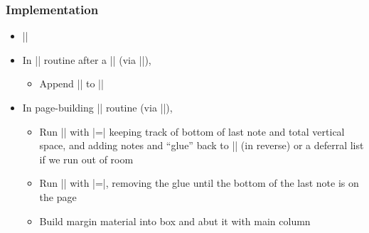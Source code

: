 \documentclass{beamer}
\begin{document}
\begin{frame}[fragile]
  \frametitle{Implementation}
  \begin{itemize}
  \item |\newtoks\marginlist|
    \vskip0.5pc
  \item In |\output| routine after a |\marginpar| {\small(via |\@addmarginpar|)},
    \begin{itemize}
    \item Append || to |\marginlist|
    \end{itemize}
    \vskip0.5pc
  \item In page-building |\output| routine {\small(via |\@combinefloats|)},
    \begin{itemize}
    \item Run |\marginlist| with |\note=\note@down| keeping track of
      bottom of last note and total vertical space, and adding notes
      and ``glue'' back to |\marginlist| (in reverse) or a deferral
      list if we run out of room
    \item Run |\marginlist| with |\note=\note@up|, removing the glue
      until the bottom of the last note is on the page
    \item Build margin material into box and abut it with main column
    \end{itemize}
  \end{itemize}
\end{frame}
\end{document}
